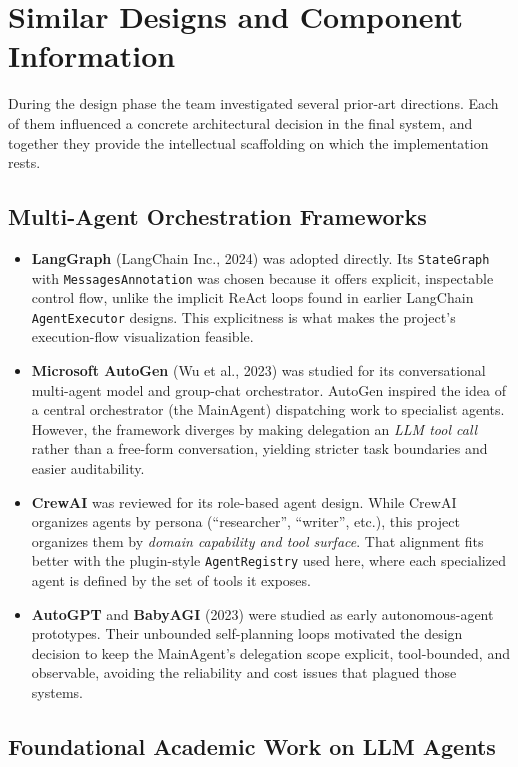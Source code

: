 \documentclass[11pt,a4paper]{report}
\newcommand{\code}[1]{\texttt{\small #1}}
\begin{document}
\section{Similar Designs and Component Information}

During the design phase the team investigated several prior-art directions.
Each of them influenced a concrete architectural decision in the final
system, and together they provide the intellectual scaffolding on which the
implementation rests.

\subsection{Multi-Agent Orchestration Frameworks}

\begin{itemize}
  \item \textbf{LangGraph} (LangChain Inc., 2024) was adopted directly. Its \code{StateGraph} with \code{MessagesAnnotation} was chosen because it offers explicit, inspectable control flow, unlike the implicit ReAct loops found in earlier LangChain \code{AgentExecutor} designs. This explicitness is what makes the project's execution-flow visualization feasible.
  \item \textbf{Microsoft AutoGen} (Wu et al., 2023) was studied for its conversational multi-agent model and group-chat orchestrator. AutoGen inspired the idea of a central orchestrator (the MainAgent) dispatching work to specialist agents. However, the framework diverges by making delegation an \emph{LLM tool call} rather than a free-form conversation, yielding stricter task boundaries and easier auditability.
  \item \textbf{CrewAI} was reviewed for its role-based agent design. While CrewAI organizes agents by persona (``researcher'', ``writer'', etc.), this project organizes them by \emph{domain capability and tool surface}. That alignment fits better with the plugin-style \code{AgentRegistry} used here, where each specialized agent is defined by the set of tools it exposes.
  \item \textbf{AutoGPT} and \textbf{BabyAGI} (2023) were studied as early autonomous-agent prototypes. Their unbounded self-planning loops motivated the design decision to keep the MainAgent's delegation scope explicit, tool-bounded, and observable, avoiding the reliability and cost issues that plagued those systems.
\end{itemize}

\subsection{Foundational Academic Work on LLM Agents}
\end{document}
